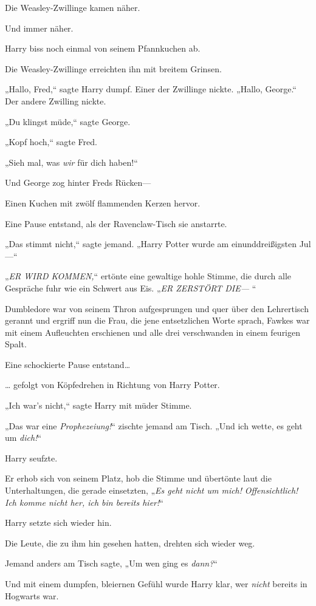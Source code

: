 {Die Weasley-Zwillinge kamen näher.

Und immer näher.

Harry biss noch einmal von seinem Pfannkuchen ab.

Die Weasley-Zwillinge erreichten ihn mit breitem Grinsen.

„Hallo, Fred,“ sagte Harry dumpf. Einer der Zwillinge nickte. „Hallo, George.“ Der andere Zwilling nickte.

„Du klingst müde,“ sagte George.

„Kopf hoch,“ sagte Fred.

„Sieh mal, was \emph{wir} für dich haben!“

Und George zog hinter Freds Rücken—

Einen Kuchen mit zwölf flammenden Kerzen hervor.

Eine Pause entstand, als der Ravenclaw-Tisch sie anstarrte.

„Das stimmt nicht,“ sagte jemand. „Harry Potter wurde am einunddreißigsten Jul—“

„\emph{ER WIRD KOMMEN,}“ ertönte eine gewaltige hohle Stimme, die durch alle Gespräche fuhr wie ein Schwert aus Eis. „\emph{ER ZERSTÖRT DIE—} “

Dumbledore war von seinem Thron aufgesprungen und quer über den Lehrertisch gerannt und ergriff nun die Frau, die jene entsetzlichen Worte sprach, Fawkes war mit einem Aufleuchten erschienen und alle drei verschwanden in einem feurigen Spalt.

Eine schockierte Pause entstand…

… gefolgt von Köpfedrehen in Richtung von Harry Potter.

„Ich war's nicht,“ sagte Harry mit müder Stimme.

„Das war eine \emph{Prophezeiung!}“ zischte jemand am Tisch. „Und ich wette, es geht um \emph{dich!}“

Harry seufzte.

Er erhob sich von seinem Platz, hob die Stimme und übertönte laut die Unterhaltungen, die gerade einsetzten, „\emph{Es geht nicht um mich!} \emph{Offensichtlich! Ich komme nicht her, ich bin bereits hier!}“

Harry setzte sich wieder hin.

Die Leute, die zu ihm hin gesehen hatten, drehten sich wieder weg.

Jemand anders am Tisch sagte, „Um wen ging es \emph{dann?}“

Und mit einem dumpfen, bleiernen Gefühl wurde Harry klar, wer \emph{nicht} bereits in Hogwarts war.

}
